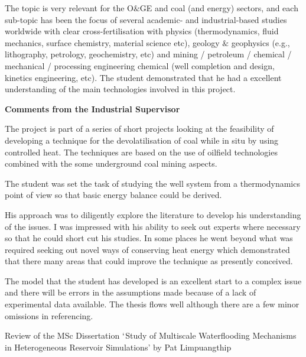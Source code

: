 \documentclass[14pt,twoside]{report}
\begin{document}
The topic is very relevant for the O$\&$GE and coal (and energy) sectors, and each sub-topic has been the focus of several academic- and industrial-based studies worldwide with clear cross-fertilisation with physics (thermodynamics, fluid mechanics, surface chemistry, material science etc), geology $\&$ geophysics (e.g., lithography, petrology, geochemistry, etc) and mining / petroleum / chemical / mechanical / processing engineering chemical (well completion and design, kinetics engineering, etc). The student demonstrated that he had a excellent understanding of the main technologies involved in this project.


\bigskip
\begin{flushleft}
{\bf Comments from the Industrial Supervisor}
\end{flushleft}
\medskip

The project is part of a series of short projects looking at the feasibility of developing a technique for the devolatilisation of coal while in situ by using controlled heat. The techniques are based on the use of oilfield technologies combined with the some underground coal mining aspects. 

The student was set the task of studying the well system from a thermodynamics point of view so that basic energy balance could be derived. 
 
His approach was to diligently explore the literature to develop his understanding of the issues.  I was impressed with his ability to seek out experts where necessary so that he could short cut his studies.  In some places he went beyond what was required seeking out novel ways of conserving heat energy which demonstrated that there many areas that could improve the technique as presently conceived.

The model that the student has developed is an excellent start to a complex issue and there will be errors in the assumptions made because of a lack of experimental data available.  The thesis flows well although there are a few minor omissions in referencing. 



\clearpage



\bigskip

\begin{center}
{\Large Review of the MSc Dissertation $\lq$Study of Multiscale Waterflooding Mechanisms in Heterogeneous Reservoir Simulations' by Pat Limpuangthip}
\end{center}
\end{document}
